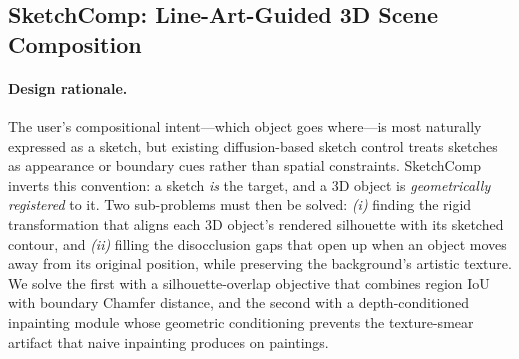 \subsection{SketchComp: Line-Art-Guided 3D Scene Composition}
\label{sec:method:sketchcomp}

\paragraph{Design rationale.}
The user's compositional intent---which object goes where---is most
naturally expressed as a sketch, but existing diffusion-based sketch
control treats sketches as appearance or boundary cues rather than
spatial constraints. SketchComp inverts this convention: a sketch
\emph{is} the target, and a 3D object is \emph{geometrically
registered} to it. Two sub-problems must then be solved:
\emph{(i)} finding the rigid transformation that aligns each 3D
object's rendered silhouette with its sketched contour, and
\emph{(ii)} filling the disocclusion gaps that open up when an object
moves away from its original position, while preserving the
background's artistic texture. We solve the first with a
silhouette-overlap objective that combines region IoU with boundary
Chamfer distance, and the second with a depth-conditioned inpainting
module whose geometric conditioning prevents the texture-smear
artifact that naive inpainting produces on paintings.

